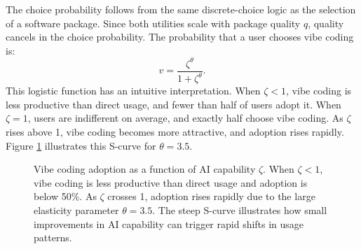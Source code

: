 \documentclass[11pt,a4paper]{article}
\theoremstyle{definition}
\theoremstyle{remark}
\begin{document}
The choice probability follows from the same discrete-choice logic as
the selection of a software package. Since both utilities scale with package quality \(q\),
quality cancels in the choice probability. The probability that a user
chooses vibe coding is: \[
v = \frac{\zeta^\theta}{1+\zeta^\theta}.
\] This logistic function has an intuitive interpretation. When
\(\zeta < 1\), vibe coding is less productive than direct usage, and
fewer than half of users adopt it. When \(\zeta = 1\), users are
indifferent on average, and exactly half choose vibe coding. As
\(\zeta\) rises above 1, vibe coding becomes more attractive, and
adoption rises rapidly. Figure \ref{fig:vibe-adoption} illustrates this
S-curve for \(\theta = 3.5\).


\begin{figure}[htbp]
\centering
{}
\caption{Vibe coding adoption as a function of AI capability $\zeta$. When $\zeta < 1$, vibe coding is less productive than direct usage and adoption is below 50\%. As $\zeta$ crosses 1, adoption rises rapidly due to the large elasticity parameter $\theta = 3.5$. The steep S-curve illustrates how small improvements in AI capability can trigger rapid shifts in usage patterns.}
\label{fig:vibe-adoption}
\end{figure}
\end{document}
